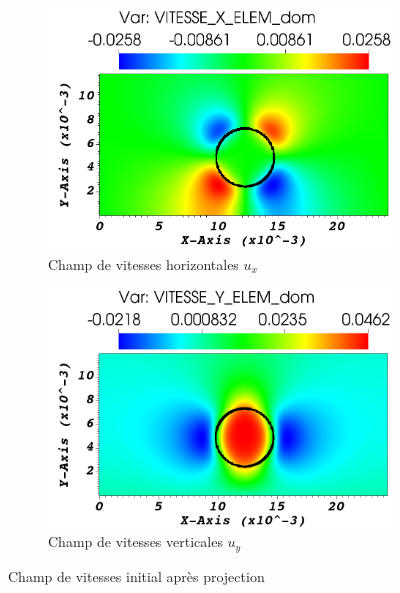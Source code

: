 \begin{figure}[H] \label{fig:champvitesse_init}
	\centering
	\begin{subfigure}[H]{0.47\textwidth}
		\centering
		\includegraphics[width=\textwidth]{figure/Champ_vitesse_initX.png}
		\caption{Champ de vitesses horizontales $u_x$}
		
	\end{subfigure} 
	\begin{subfigure}[H]{0.47\textwidth}
		\centering
		\includegraphics[width=\textwidth]{figure/Champ_vitesse_initY.png}
		\caption{Champ de vitesses verticales $u_y$}
	\end{subfigure}
	\caption{Champ de vitesses initial après projection}
\end{figure}
